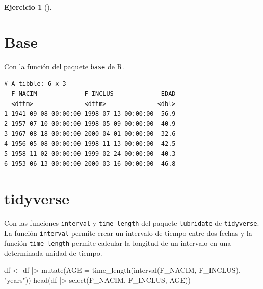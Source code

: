 \documentclass[
  a4paper,
]{scrreport}
\newenvironment{Shaded}{\begin{snugshade}}{\end{snugshade}}
\newcommand{\AttributeTok}[1]{\textcolor[rgb]{0.40,0.45,0.13}{#1}}
\newcommand{\DecValTok}[1]{\textcolor[rgb]{0.68,0.00,0.00}{#1}}
\newcommand{\FunctionTok}[1]{\textcolor[rgb]{0.28,0.35,0.67}{#1}}
\newcommand{\NormalTok}[1]{\textcolor[rgb]{0.00,0.23,0.31}{#1}}
\newcommand{\OtherTok}[1]{\textcolor[rgb]{0.00,0.23,0.31}{#1}}
\newcommand{\SpecialCharTok}[1]{\textcolor[rgb]{0.37,0.37,0.37}{#1}}
\newcommand{\StringTok}[1]{\textcolor[rgb]{0.13,0.47,0.30}{#1}}
\theoremstyle{definition}
\newtheorem{exercise}{Ejercicio}[chapter]
\theoremstyle{remark}
\begin{document}
\begin{exercise}[]
\begin{enumerate}
\begin{tcolorbox}
  \section{Base}

  Con la función del paquete \texttt{base} de R.

\begin{Shaded}
\end{Shaded}

\begin{verbatim}
# A tibble: 6 x 3
  F_NACIM             F_INCLUS             EDAD
  <dttm>              <dttm>              <dbl>
1 1941-09-08 00:00:00 1998-07-13 00:00:00  56.9
2 1957-07-10 00:00:00 1998-05-09 00:00:00  40.9
3 1967-08-18 00:00:00 2000-04-01 00:00:00  32.6
4 1956-05-08 00:00:00 1998-11-13 00:00:00  42.5
5 1958-11-02 00:00:00 1999-02-24 00:00:00  40.3
6 1953-06-13 00:00:00 2000-03-16 00:00:00  46.8
\end{verbatim}

  \section{tidyverse}

  Con las funciones \texttt{interval} y \texttt{time\_length} del
  paquete \texttt{lubridate} de \texttt{tidyverse}. La función
  \texttt{interval} permite crear un intervalo de tiempo entre dos
  fechas y la función \texttt{time\_length} permite calcular la longitud
  de un intervalo en una determinada unidad de tiempo.

\begin{Shaded}
\begin{Highlighting}[]
\NormalTok{df }\OtherTok{\textless{}{-}}\NormalTok{ df }\SpecialCharTok{|\textgreater{}} \FunctionTok{mutate}\NormalTok{(}\AttributeTok{AGE =} \FunctionTok{time\_length}\NormalTok{(}\FunctionTok{interval}\NormalTok{(F\_NACIM, F\_INCLUS), }\StringTok{"years"}\NormalTok{))}
\FunctionTok{head}\NormalTok{(df }\SpecialCharTok{|\textgreater{}}  \FunctionTok{select}\NormalTok{(F\_NACIM, F\_INCLUS, AGE))}
\end{Highlighting}
\end{Shaded}


\end{tcolorbox}
\end{enumerate}
\end{exercise}
\end{document}
